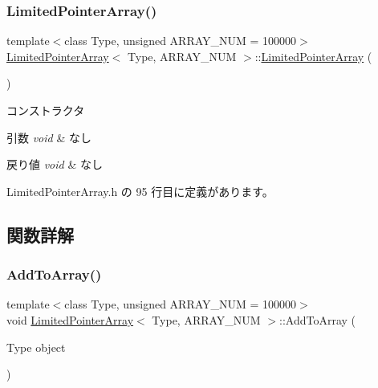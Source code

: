 \subsubsection{\texorpdfstring{Limited\+Pointer\+Array()}{LimitedPointerArray()}}
{\footnotesize\ttfamily template$<$class Type, unsigned A\+R\+R\+A\+Y\+\_\+\+N\+UM = 100000$>$ \\
\mbox{\hyperlink{class_limited_pointer_array}{Limited\+Pointer\+Array}}$<$ Type, A\+R\+R\+A\+Y\+\_\+\+N\+UM $>$\+::\mbox{\hyperlink{class_limited_pointer_array}{Limited\+Pointer\+Array}} (\begin{DoxyParamCaption}{ }\end{DoxyParamCaption})\hspace{0.3cm}{\ttfamily [inline]}}



コンストラクタ 


\begin{DoxyParams}{引数}
{\em void} & なし \\
\hline
\end{DoxyParams}

\begin{DoxyRetVals}{戻り値}
{\em void} & なし \\
\hline
\end{DoxyRetVals}


 Limited\+Pointer\+Array.\+h の 95 行目に定義があります。



\subsection{関数詳解}
\mbox{\label{class_limited_pointer_array_a57eb08357204668710021965425f4f46}} 
\subsubsection{\texorpdfstring{Add\+To\+Array()}{AddToArray()}}
{\footnotesize\ttfamily template$<$class Type, unsigned A\+R\+R\+A\+Y\+\_\+\+N\+UM = 100000$>$ \\
void \mbox{\hyperlink{class_limited_pointer_array}{Limited\+Pointer\+Array}}$<$ Type, A\+R\+R\+A\+Y\+\_\+\+N\+UM $>$\+::Add\+To\+Array (\begin{DoxyParamCaption}\item[{Type}]{object }\end{DoxyParamCaption})\hspace{0.3cm}{\ttfamily [inline]}}



